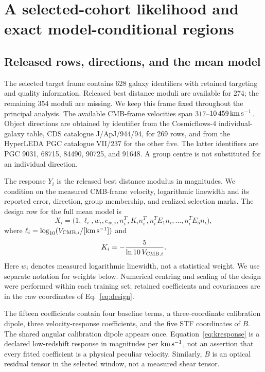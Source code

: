 \section{A selected-cohort likelihood and exact model-conditional regions}
\label{sec:likelihood}

\subsection{Released rows, directions, and the mean model}

The selected target frame contains 628 galaxy identifiers with retained targeting and quality information. Released best distance moduli are available for 274; the remaining 354 moduli are missing. We keep this frame fixed throughout the principal analysis. The available CMB-frame velocities span $317$--$10\,459\,\mathrm{km}\,\mathrm{s}^{-1}$. Object directions are obtained by identifier from the Cosmicflows-4 individual-galaxy table, CDS catalogue J/ApJ/944/94, for 269 rows, and from the HyperLEDA PGC catalogue VII/237 for the other five. The latter identifiers are PGC 9031, 68715, 84490, 90725, and 91648. A group centre is not substituted for an individual direction.

The response $Y_i$ is the released best distance modulus in magnitudes. We condition on the measured CMB-frame velocity, logarithmic linewidth and its reported error, direction, group membership, and realized selection marks. The design row for the full mean model is
\begin{equation}
 X_i=\bigl(1,\ell_i,w_i,e_{w,i},n_i^T,K_i n_i^T,
                 n_i^TE_1n_i,\ldots,n_i^TE_5n_i\bigr),
 \label{eq:design}
\end{equation}
where $\ell_i=\log_{10}(V_{{\rm CMB},i}/[\mathrm{km}\,\mathrm{s}^{-1}])$ and
\begin{equation}
 K_i=-\frac{5}{\ln10\,V_{{\rm CMB},i}}.
 \label{eq:kresponse}
\end{equation}
Here $w_i$ denotes measured logarithmic linewidth, not a statistical weight. We use separate notation for weights below. Numerical centring and scaling of the design were performed within each training set; retained coefficients and covariances are in the raw coordinates of Eq.~\eqref{eq:design}.

The fifteen coefficients contain four baseline terms, a three-coordinate calibration dipole, three velocity-response coefficients, and the five STF coordinates of $B$. The shared angular calibration dipole appears once. Equation~\eqref{eq:kresponse} is a declared low-redshift response in magnitudes per $\mathrm{km}\,\mathrm{s}^{-1}$, not an assertion that every fitted coefficient is a physical peculiar velocity. Similarly, $B$ is an optical residual tensor in the selected window, not a measured shear tensor.

